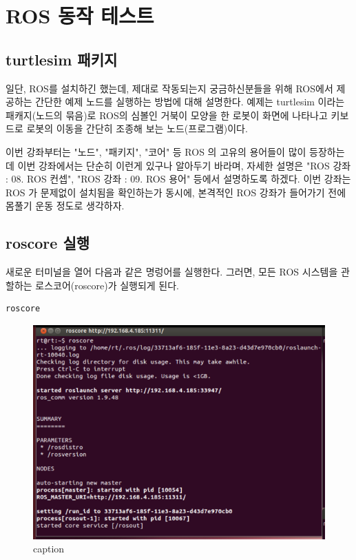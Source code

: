 \section{ROS 동작 테스트}

\subsection{turtlesim 패키지}
일단, ROS를 설치하긴 했는데, 제대로 작동되는지 궁금하신분들을 위해 ROS에서 제공하는 간단한 예제 노드를 실행하는 방법에 대해 설명한다. 예제는 turtlesim 이라는 패캐지(노드의 묶음)로 ROS의 심볼인 거북이 모양을 한 로봇이 화면에 나타나고 키보드로 로봇의 이동을 간단히 조종해 보는 노드(프로그램)이다.

이번 강좌부터는 "노드", "패키지", "코어" 등 ROS 의 고유의 용어들이 많이 등장하는데 이번 강좌에서는 단순히 이런게 있구나 알아두기 바라며, 자세한 설명은 "ROS 강좌 : 08. ROS 컨셉", "ROS 강좌 : 09. ROS 용어" 등에서 설명하도록 하겠다. 이번 강좌는 ROS 가 문제없이 설치됨을 확인하는가 동시에, 본격적인 ROS 강좌가 들어가기 전에 몸풀기 운동 정도로 생각하자.

\subsection{roscore 실행}
새로운 터미널을 열어 다음과 같은 명렁어를 실행한다. 그러면, 모든 ROS 시스템을 관할하는 로스코어(roscore)가 실행되게 된다.

\begin{lstlisting}[language=bash]
roscore
\end{lstlisting}

\begin{figure}[h]
\centering\includegraphics[width=0.7\columnwidth]{pictures/chapter2/roscore.png}
\caption{caption}
\end{figure}


